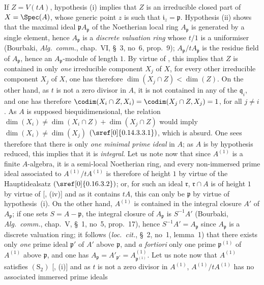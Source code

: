 If $Z=V(tA)$, hypothesis (i) implies that $Z$ is an irreducible closed part of $X=\Spec(A)$, whose generic point $z$ is such that $\mathfrak{i}_z=\mathfrak{p}$.
Hypothesis (ii) shows that the maximal ideal $\mathfrak{p}A_\mathfrak{p}$ of the Noetherian local ring $A_\mathfrak{p}$ is generated by a single element, hence $A_\mathfrak{p}$ is a \emph{discrete valuation ring} whose $t/1$ is a uniformiser (Bourbaki, \emph{Alg.\ comm.}, chap.~VI, \S~3, no~6, prop.~9); $A_\mathfrak{p}/tA_\mathfrak{p}$ is the residue field of $A_\mathfrak{p}$, hence an $A_\mathfrak{p}$-module of length $1$.
By virtue of , this implies that $Z$ is contained in only \emph{one} irreducible component $X_j$ of $X$, for every other irreducible component $X_j$ of $X$, one has therefore $\dim(X_j\cap Z)<\dim(Z)$.
On the other hand, as $t$ is not a zero divisor in $A$, it is not contained in any of the $\mathfrak{q}_i$, and one has therefore  $\codim(X_i\cap Z,X_i)=\codim(X_j\cap Z,X_j)=1$, for all $j\neq i$.
As $A$ is supposed biequidimensional, the relation $\dim(X_i)\neq\dim(X_i\cap Z)+\dim(X_j\cap Z)$ would imply $\dim(X_i)\neq\dim(X_j)$ $(\sref[0]{0.14.3.3.1})$, which is absurd.
One sees therefore that there is only \emph{one minimal prime ideal} in $A$; as $A$ is by hypothesis reduced, this implies that it is \emph{integral}.
Let us note now that since $A^{(1)}$ is a finite $A$-algebra, it is a semi-local Noetherian ring, and every non-immersed prime ideal associated to $A^{(1)}/tA^{(1)}$ is therefore of height $1$ by virtue of the Hauptidealsatz $(\sref[0]{0.16.3.2})$; or, for such an ideal $\mathfrak{r}$, $\mathfrak{r}\cap A$ is of height $1$ by virtue of [, (iv)] and as it contains $tA$, this can only be $\mathfrak{p}$ by virtue of hypothesis~(i).
On the other hand, $A^{(1)}$ is contained in the integral closure $A'$ of $A_\mathfrak{p}$; if one sets $S=A-\mathfrak{p}$, the integral closure of $A_\mathfrak{p}$ is $S^{-1}A'$ (Bourbaki, \emph{Alg.\ comm.}, chap.~V, \S~1, no~5, prop.~17), hence $S^{-1}A'=A_\mathfrak{p}$ since $A_\mathfrak{p}$ is a discrete valuation ring; it follows (\emph{loc.\ cit.}, \S~2, no~1, lemma~1) that there exists only \emph{one} prime ideal $\mathfrak{p}'$ of $A'$ above $\mathfrak{p}$, and \emph{a fortiori} only one prime $\mathfrak{p}^{(1)}$ of $A^{(1)}$ above $\mathfrak{p}$, and one has $A_\mathfrak{p}=A'_{\mathfrak{p}'}=A^{(1)}_{\mathfrak{p}^{(1)}}$.
Let us note now that $A^{(1)}$ satisfies $(\mathrm{S}_2)$ [, (i)] and as $t$ is not a zero divisor in $A^{(1)}$, $A^{(1)}/tA^{(1)}$ has no associated immersed prime ideals

